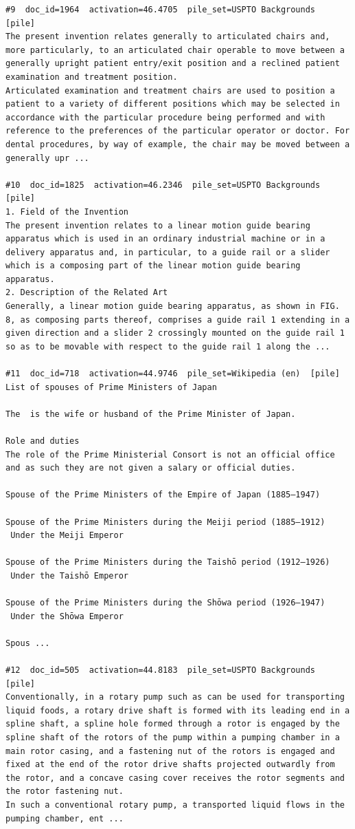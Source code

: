 \begin{verbatim}
#9  doc_id=1964  activation=46.4705  pile_set=USPTO Backgrounds  [pile]
The present invention relates generally to articulated chairs and, more particularly, to an articulated chair operable to move between a generally upright patient entry/exit position and a reclined patient examination and treatment position.
Articulated examination and treatment chairs are used to position a patient to a variety of different positions which may be selected in accordance with the particular procedure being performed and with reference to the preferences of the particular operator or doctor. For dental procedures, by way of example, the chair may be moved between a generally upr ...

#10  doc_id=1825  activation=46.2346  pile_set=USPTO Backgrounds  [pile]
1. Field of the Invention
The present invention relates to a linear motion guide bearing apparatus which is used in an ordinary industrial machine or in a delivery apparatus and, in particular, to a guide rail or a slider which is a composing part of the linear motion guide bearing apparatus.
2. Description of the Related Art
Generally, a linear motion guide bearing apparatus, as shown in FIG. 8, as composing parts thereof, comprises a guide rail 1 extending in a given direction and a slider 2 crossingly mounted on the guide rail 1 so as to be movable with respect to the guide rail 1 along the ...

#11  doc_id=718  activation=44.9746  pile_set=Wikipedia (en)  [pile]
List of spouses of Prime Ministers of Japan

The  is the wife or husband of the Prime Minister of Japan.

Role and duties
The role of the Prime Ministerial Consort is not an official office and as such they are not given a salary or official duties.

Spouse of the Prime Ministers of the Empire of Japan (1885–1947)

Spouse of the Prime Ministers during the Meiji period (1885–1912)
 Under the Meiji Emperor

Spouse of the Prime Ministers during the Taishō period (1912–1926)
 Under the Taishō Emperor

Spouse of the Prime Ministers during the Shōwa period (1926–1947)
 Under the Shōwa Emperor

Spous ...

#12  doc_id=505  activation=44.8183  pile_set=USPTO Backgrounds  [pile]
Conventionally, in a rotary pump such as can be used for transporting liquid foods, a rotary drive shaft is formed with its leading end in a spline shaft, a spline hole formed through a rotor is engaged by the spline shaft of the rotors of the pump within a pumping chamber in a main rotor casing, and a fastening nut of the rotors is engaged and fixed at the end of the rotor drive shafts projected outwardly from the rotor, and a concave casing cover receives the rotor segments and the rotor fastening nut.
In such a conventional rotary pump, a transported liquid flows in the pumping chamber, ent ...


\end{verbatim}
